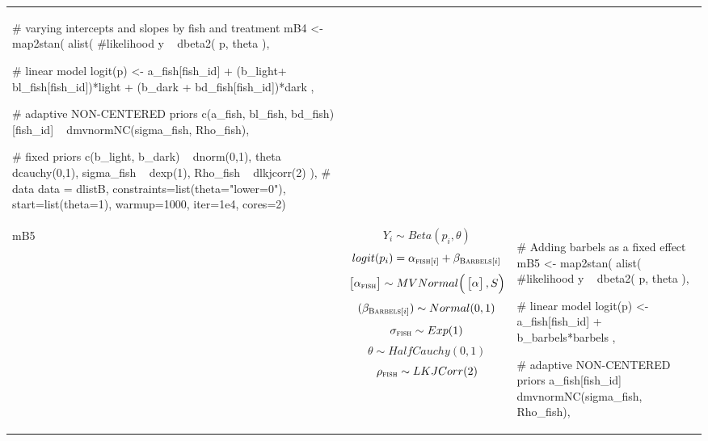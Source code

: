 \begin{longtable}{p{} |p{} |p{} }
{\begin{mylist}
# varying intercepts and slopes by fish and treatment
mB4 <- map2stan(
  alist(
    #likelihood
    y ~ dbeta2( p, theta ),
    
    # linear model
    logit(p) <- a_fish[fish_id] + 
    (b_light+ bl_fish[fish_id])*light + 
    (b_dark + bd_fish[fish_id])*dark ,
    
    # adaptive NON-CENTERED priors 
    c(a_fish, bl_fish, bd_fish)[fish_id] ~ 
    dmvnormNC(sigma_fish, Rho_fish),
    
    # fixed priors
    c(b_light, b_dark) ~ dnorm(0,1),
    theta ~ dcauchy(0,1),
    sigma_fish ~ dexp(1),
    Rho_fish ~ dlkjcorr(2)
  ),
  # data
  data = dlistB,
  constraints=list(theta="lower=0"),
  start=list(theta=1), warmup=1000, iter=1e4, cores=2) \end{mylist}}
\\ %
mB5& %
$$ Y_i \sim Beta(p_i, \theta) $$
\small $$ logit(p_i) =  \alpha_{\textsc{fish}[i]} + \beta_{\textsc{Barbels}[i]}$$
$$
\begin{bmatrix}
\alpha_{\textsc{fish}} \\
\end{bmatrix} \sim MVNormal \Big(
\begin{bmatrix}
\alpha \\
\end{bmatrix}, S \Big)
$$
$$ (\beta_{\textsc{Barbels}[i]})  \sim Normal(0,1) $$
$$ \sigma_{\textsc{fish}} \sim Exp(1) $$
$$ \theta \sim HalfCauchy(0, 1) $$
$$ \rho_{\textsc{fish}} \sim LKJCorr(2) $$
&
{\begin{mylist} %

# Adding barbels as a fixed effect
mB5 <- map2stan(
  alist(
    #likelihood
    y ~ dbeta2( p, theta ),
    
    # linear model
    logit(p) <- a_fish[fish_id] + b_barbels*barbels ,
    
    # adaptive NON-CENTERED priors 
    a_fish[fish_id] ~ dmvnormNC(sigma_fish, Rho_fish),
    

\end{mylist}}
\end{longtable}
